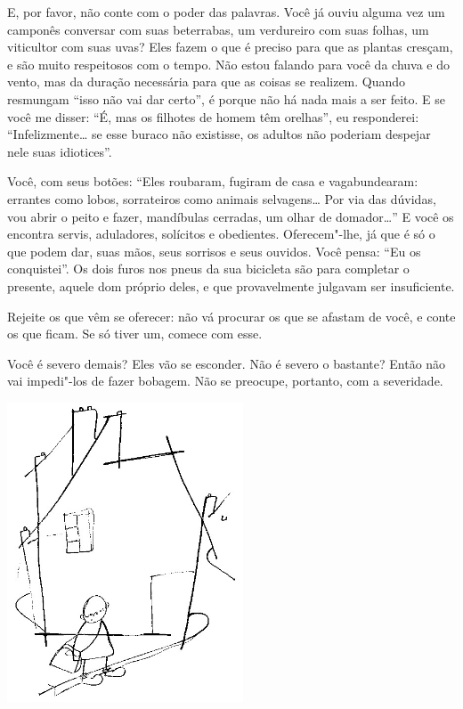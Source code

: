 \bigskip
\bigskip

E, por favor, não conte com o poder das palavras. Você já ouviu alguma
vez um camponês conversar com suas beterrabas, um verdureiro com suas
folhas, um viticultor com suas uvas? Eles fazem o que é preciso para que
as plantas cresçam, e são muito respeitosos com o tempo. Não estou
falando para você da chuva e do vento, mas da duração necessária para
que as coisas se realizem. Quando resmungam ``isso não vai dar certo'',
é porque não há nada mais a ser feito. E se você me disser: ``É, mas os
filhotes de homem têm orelhas'', eu responderei: ``Infelizmente\ldots{} se
esse buraco não existisse, os adultos não poderiam despejar nele suas
idiotices''.

\bigskip
\bigskip


Você, com seus botões: ``Eles roubaram, fugiram de casa e vagabundearam:
errantes como lobos, sorrateiros como animais selvagens\ldots{} Por via das
dúvidas, vou abrir o peito e fazer, mandíbulas cerradas, um olhar de
domador\ldots{}'' E você os encontra servis, aduladores, solícitos e
obedientes. Oferecem"-lhe, já que é só o que podem dar, suas mãos, seus
sorrisos e seus ouvidos. Você pensa: ``Eu os conquistei''. Os dois furos
nos pneus da sua bicicleta são para completar o presente, aquele dom
próprio deles, e que provavelmente julgavam ser insuficiente.

\bigskip
\bigskip


Rejeite os que vêm se oferecer: não vá procurar os que se afastam de
você, e conte os que ficam. Se só tiver um, comece com esse.

\bigskip
\bigskip


Você é severo demais? Eles vão se esconder. Não é severo o bastante?
Então não vai impedi"-los de fazer bobagem. Não se preocupe, portanto,
com a severidade.

\begin{center}
\includegraphics[width=70mm]{./imgs/Image_3.jpg}
\end{center}

